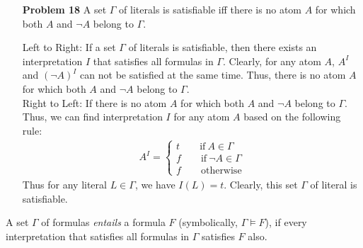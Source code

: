 \documentclass[12pt]{article}
\begin{document}
\begin{enumerate}
\item[\textbf{Problem 18}] A set $\Gamma$ of literals is satisfiable iff there is no atom $A$ for which both $A$ and $\neg A$ belong to $\Gamma$. 

Left to Right: If a set $\Gamma$ of literals is satisfiable, then there exists an interpretation $I$ that satisfies all formulas in $\Gamma$. Clearly, for any atom $A$, $A^I$ and $(\neg A)^I$ can not be satisfied at the same time. Thus, there is no atom $A$ for which both $A$ and $\neg A$ belong to $\Gamma$. \\
Right to Left: If there is no atom $A$ for which both $A$ and $\neg A$ belong to $\Gamma$. Thus, we can find interpretation $I$ for any atom $A$ based on the following rule:
\begin{gather*}
A^I =  \left\{
        \begin{array}{c}      
        t \qquad \text{if} \: A \in \Gamma \\
        f \qquad \text{if} \: \neg A \in \Gamma \\
        f \qquad \text{otherwise}
        \end{array}\right.
\end{gather*}
Thus for any literal $L \in \Gamma$, we have $I(L) = t$. Clearly, this set $\Gamma$ of literal is satisfiable. 

\end{enumerate}







\noindent A set $\Gamma$ of formulas \textit{entails} a formula $F$ (symbolically, $\Gamma \models F$), if every interpretation that satisfies all formulas in $\Gamma$ satisfies $F$ also. 
\end{document}
